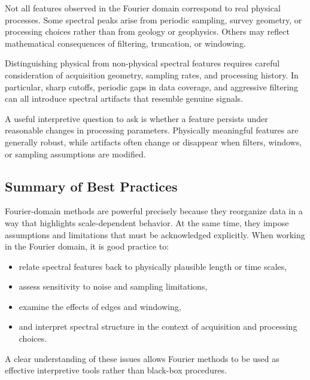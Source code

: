 Not all features observed in the Fourier domain correspond to real physical processes. Some spectral peaks arise from periodic sampling, survey geometry, or processing choices rather than from geology or geophysics. Others may reflect mathematical consequences of filtering, truncation, or windowing.

Distinguishing physical from non-physical spectral features requires careful consideration of acquisition geometry, sampling rates, and processing history. In particular, sharp cutoffs, periodic gaps in data coverage, and aggressive filtering can all introduce spectral artifacts that resemble genuine signals.

A useful interpretive question to ask is whether a feature persists under reasonable changes in processing parameters. Physically meaningful features are generally robust, while artifacts often change or disappear when filters, windows, or sampling assumptions are modified.

\subsection{Summary of Best Practices}

Fourier-domain methods are powerful precisely because they reorganize data in a way that highlights scale-dependent behavior. At the same time, they impose assumptions and limitations that must be acknowledged explicitly. When working in the Fourier domain, it is good practice to:
\begin{itemize}
    \item relate spectral features back to physically plausible length or time scales,
    \item assess sensitivity to noise and sampling limitations,
    \item examine the effects of edges and windowing,
    \item and interpret spectral structure in the context of acquisition and processing choices.
\end{itemize}

A clear understanding of these issues allows Fourier methods to be used as effective interpretive tools rather than black-box procedures.



